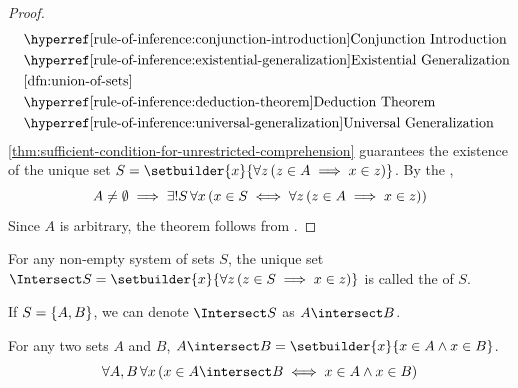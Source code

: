 \begin{proof}
\begin{equation*}
\begin{aligned}
            &\quad\text{\aref{rule-of-inference:conjunction-introduction}{Conjunction Introduction}} \\
            &\quad\text{\aref{rule-of-inference:existential-generalization}{Existential Generalization}} \\
            &\quad\text{\cref{dfn:union-of-sets}} \\
            &\quad\text{\aref{rule-of-inference:deduction-theorem}{Deduction Theorem}} \\
            &\quad\text{\aref{rule-of-inference:universal-generalization}{Universal Generalization}} \\
        \end{aligned}
    \end{equation*}
    \cref{thm:sufficient-condition-for-unrestricted-comprehension} guarantees the existence
    of the unique set \( S = \setbuilder{x}{\forall z \, \mleft( z \in A \implies x \in z \mright)} \).
    By the ,
    \begin{equation*}
        A \neq \emptyset \implies \exists! S \, \forall x \, \mleft( x \in S \iff
        \forall z \, \mleft( z \in A \implies x \in z \mright)\mright)
    \end{equation*}
    Since \( A \) is arbitrary, the theorem follows from .
\end{proof}

\begin{dfn}[Intersection]
    \label{dfn:intersection-of-sets}
    For any non-empty system of sets \( S \), the unique set \( \Intersect S =
    \setbuilder{x}{\forall z \, \mleft( z \in S \implies x \in z \mright)}\) is called
    the  of \( S \).
\end{dfn}

\begin{notation}
     If \( S = \mleft\{A, B\mright\} \), we can denote \( \Intersect S \) as \( A \intersect B \).
\end{notation}

\begin{thm}
    \label{thm:intersection-in-terms-of-logical-and}
    For any two sets \( A \) and \( B \), \( A \intersect B = \setbuilder{x}{x \in A \land x \in B} \).
    \begin{equation*}
        \forall A,B \, \forall x \, \mleft( x \in A \intersect B \iff x \in A \land x \in B \mright)
    \end{equation*}
\end{thm}


